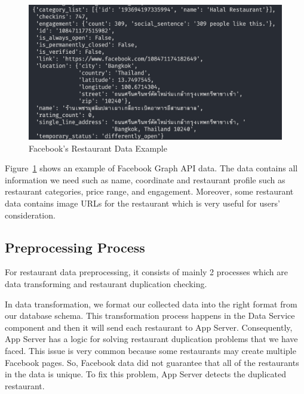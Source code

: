 \documentclass[12pt,oneside,openright,a4paper]{cpe-english-project}
\begin{document}
\newpage
\begin{figure}[H]\centering
\includegraphics[width=400pt]{./images/4FacebooksRestaurantDataExample.png}
\caption{Facebook’s Restaurant Data Example}\label{fig:4FacebooksRestaurantDataExample}
\end{figure}

Figure~\ref{fig:4FacebooksRestaurantDataExample} shows an example of Facebook Graph API data. The data contains all information we need such as name, coordinate and restaurant profile such as restaurant categories, price range, and engagement. Moreover, some restaurant data contains image URLs for the restaurant which is very useful for users’ consideration.

\subsection{Preprocessing Process}

For restaurant data preprocessing, it consists of mainly 2 processes which are data transforming and restaurant duplication checking.

In data transformation, we format our collected data into the right format from our database schema. This transformation process happens in the Data Service component and then it will send each restaurant to App Server. Consequently, App Server has a logic for solving restaurant duplication problems that we have faced. This issue is very common because some restaurants may create multiple Facebook pages. So, Facebook data did not guarantee that all of the restaurants in the data is unique. To fix this problem, App Server detects the duplicated restaurant.
\end{document}
